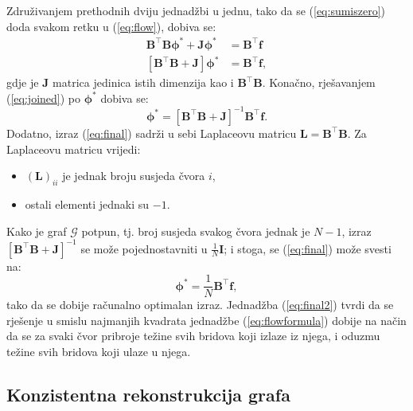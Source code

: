 \documentclass[lmodern, utf8, diplomski, numeric]{fer}
\newcommand{\matr}[1]{\mathbold{#1}}
\newcommand{\graph}[1]{\mathcal{#1}}
\newcommand{\T}{\top}
\begin{document}
  Združivanjem prethodnih dviju jednadžbi u jednu, tako da se (\ref{eq:sumiszero}) doda svakom retku u (\ref{eq:flow}), dobiva se:
  \begin{align}
  \matr{B}^\T \matr{B} \matr{\phi^*} + \matr{J} \matr{\phi^*} &= \matr{B}^\T \matr{f} \nonumber \\
  \label{eq:joined}
  \left[\matr{B}^\T \matr{B} + \matr{J} \right] \matr{\phi^*} &= \matr{B}^\T \matr{f},
  \end{align}
  gdje je $\matr{J}$ matrica jedinica istih dimenzija kao i $\matr{B}^\T \matr{B}$.
  Konačno, rješavanjem (\ref{eq:joined}) po $\matr{\phi^*}$ dobiva se:
  \begin{equation}
  \label{eq:final}
  \matr{\phi^*} = \left[\matr{B}^\T \matr{B} + \matr{J} \right]^{-1} \matr{B}^\T \matr{f}.
  \end{equation}
  Dodatno, izraz (\ref{eq:final}) sadrži u sebi Laplaceovu matricu $\matr{L} = \matr{B}^\T\matr{B}$.
  Za Laplaceovu matricu vrijedi:
  \begin{itemize}
    \item $(\matr{L})_{ii}$ je jednak broju susjeda čvora $i$,
    \item ostali elementi jednaki su $-1$.
  \end{itemize}
  Kako je graf $\graph{G}$ potpun, tj. broj susjeda svakog čvora jednak je $N - 1$, izraz $\left[ \matr{B}^\T \matr{B} + \matr{J} \right]^{-1}$ se može pojednostavniti u $\frac{1}{N} \matr{I}$; i stoga, se (\ref{eq:final}) može svesti na:
  \begin{equation}
  \label{eq:final2}
  \matr{\phi^*} = \frac{1}{N} \matr{B}^\T \matr{f},
  \end{equation}
  tako da se dobije računalno optimalan izraz.
  Jednadžba (\ref{eq:final2}) tvrdi da se rješenje u smislu najmanjih kvadrata jednadžbe (\ref{eq:flowformula}) dobije na način da se za svaki čvor pribroje težine svih bridova koji izlaze iz njega, i oduzmu težine svih bridova koji ulaze u njega.
  
  \subsection{Konzistentna rekonstrukcija grafa}
  
\end{document}
